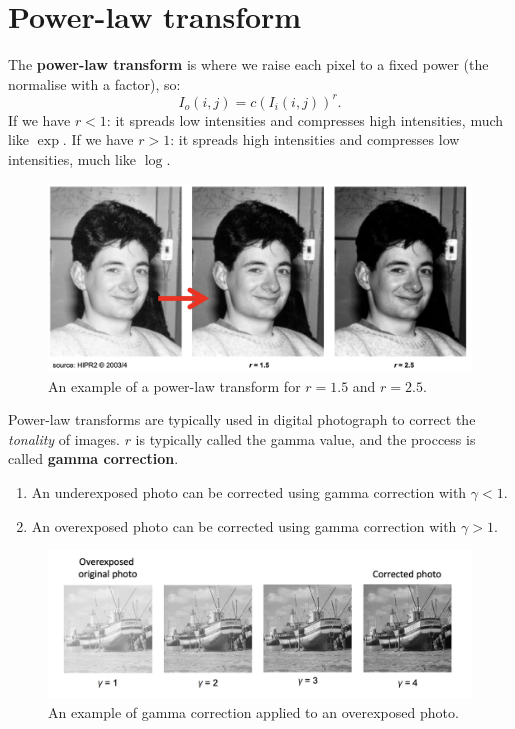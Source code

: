 \section{Power-law transform}

The \textbf{power-law transform} is where we raise each pixel to a fixed power
(the normalise with a factor),
so:
\[ I_o(i, j) = c\left(I_i(i, j)\right)^r. \]
If we have $r < 1$: it spreads low intensities and compresses high intensities, much like $\exp$.
If we have $r > 1$: it spreads high intensities and compresses low intensities, much like $\log$.

\begin{figure}
    \centering
    \includegraphics[width=0.8\linewidth]{images/power-law-transform.png}
    \caption{An example of a power-law transform for  $r = 1.5$ and $r = 2.5$.}
    \label{fig:power-law-transform}
\end{figure}

Power-law transforms are typically used in digital photograph to correct the \emph{tonality} of images.
$r$ is typically called the gamma value, and the proccess is called 
\textbf{gamma correction}.

\begin{example}
    \begin{enumerate}
        \item An underexposed photo can be corrected using gamma correction with $\gamma < 1$.
        \item An overexposed photo can be corrected using gamma correction with $\gamma > 1$.
    \end{enumerate}
\end{example}

\begin{figure}
    \centering
    \includegraphics[width=0.8\linewidth]{images/gamma-correction-1.png}
    \caption{An example of gamma correction applied to an overexposed photo.}
    \label{fig:gamma-correction-1}
\end{figure}

